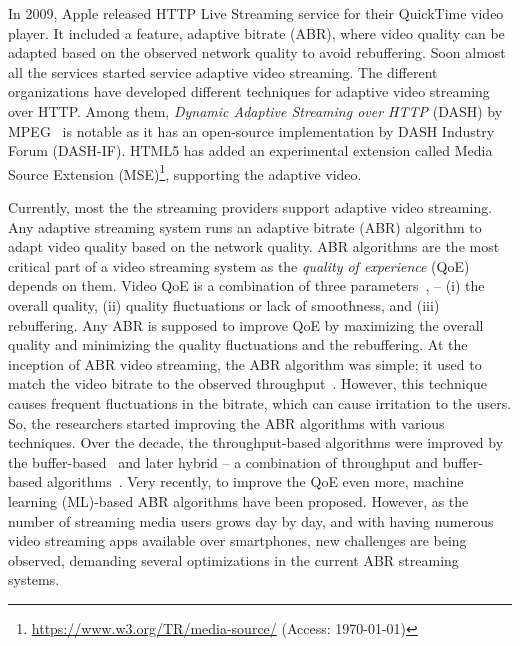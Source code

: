 In 2009, Apple released HTTP Live Streaming service for their QuickTime video player. It included a feature, adaptive bitrate (ABR), where video quality can be adapted based on the observed network quality to avoid rebuffering. Soon almost all the services started service adaptive video streaming. The different organizations have developed different techniques for adaptive video streaming over HTTP. Among them, \textit{Dynamic Adaptive Streaming over HTTP} (DASH) by MPEG~\cite{ISO/IEC23009-1:2019} is notable as it has an open-source implementation by DASH Industry Forum (DASH-IF). HTML5 has added an experimental extension called Media Source Extension (MSE)\footnote{\url{https://www.w3.org/TR/media-source/} (Access: \today)}, supporting the adaptive video. 


Currently, most the the streaming providers support adaptive video streaming. Any adaptive streaming system runs an adaptive bitrate (ABR) algorithm to adapt video quality based on the network quality. ABR algorithms are the most critical part of a video streaming system as the \textit{quality of experience} (QoE) depends on them. Video QoE is a combination of three parameters~\cite{yin2015control}, -- (i) the overall quality, (ii) quality fluctuations or lack of smoothness, and (iii) rebuffering. Any ABR is supposed to improve QoE by maximizing the overall quality and minimizing the quality fluctuations and the rebuffering. At the inception of ABR video streaming, the ABR algorithm was simple; it used to match the video bitrate to the observed throughput~\cite{5677508,10.1145/1943552.1943575,10.1145/1943552.1943574}. However, this technique causes frequent fluctuations in the bitrate, which can cause irritation to the users. So, the researchers started improving the ABR algorithms with various techniques. Over the decade, the throughput-based algorithms were improved by the buffer-based~\cite{Spiteri2016,10.1145/2910017.2910596,7393865} and later hybrid -- a combination of throughput and buffer-based algorithms~\cite{7247436,140405,yin2015control,10.1145/2670518.2673877}. Very recently, to improve the QoE even more, machine learning (ML)-based\cite{mao2017neural,Akhtar2018,9155492} ABR algorithms have been proposed. However, as the number of streaming media users grows day by day, and with having numerous video streaming apps available over smartphones, new challenges are being observed, demanding several optimizations in the current ABR streaming systems. 

